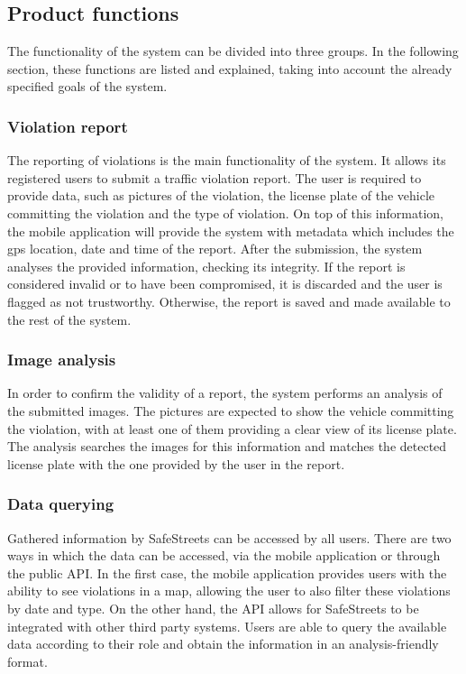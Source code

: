 \subsection{Product functions}
The functionality of the system can be divided into three groups. In the following section, these functions are listed and explained, taking into account the already specified goals of the system.

\subsubsection{Violation report}
The reporting of violations is the main functionality of the system. It allows its registered users to submit a traffic violation report. The user is required to provide data, such as pictures of the violation, the license plate of the vehicle committing the violation and the type of violation. On top of this information, the mobile application will provide the system with metadata which includes the gps location, date and time of the report.
After the submission, the system analyses the provided information, checking its integrity. If the report is considered invalid or to have been compromised, it is discarded and the user is flagged as not trustworthy. Otherwise, the report is saved and made available to the rest of the system.

\subsubsection{Image analysis}
In order to confirm the validity of a report, the system performs an analysis of the submitted images. The pictures are expected to show the vehicle committing the violation, with at least one of them providing a clear view of its license plate. The analysis searches the images for this information and matches the detected license plate with the one provided by the user in the report.

\subsubsection{Data querying}
Gathered information by SafeStreets can be accessed by all users. There are two ways in which the data can be accessed, via the mobile application or through the public API.
In the first case, the mobile application provides users with the ability to see violations in a map, allowing the user to also filter these violations by date and type. 
On the other hand, the API allows for SafeStreets to be integrated with other third party systems. Users are able to query the available data according to their role and obtain the information in an analysis-friendly format.

